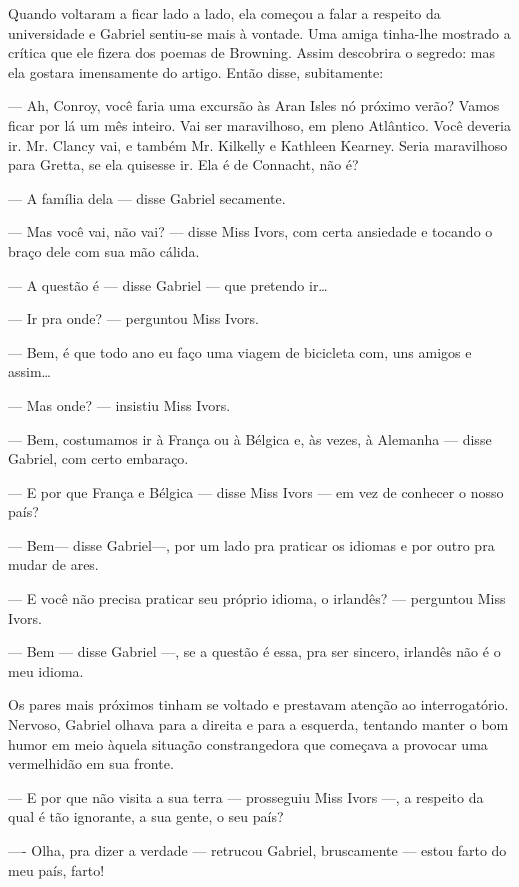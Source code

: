 Quando voltaram a ficar lado a lado, ela começou a falar a respeito
da universidade e Gabriel sentiu-se mais à vontade. Uma amiga
tinha-lhe mostrado a crítica que ele fizera dos poemas de Browning.
Assim descobrira o segredo: mas ela gostara imensamente do artigo.
Então disse, subitamente:

--- Ah, Conroy, você faria uma excursão às Aran Isles nó próximo
verão? Vamos ficar por lá um mês inteiro. Vai
ser maravilhoso, em pleno Atlântico. Você deveria ir. Mr. Clancy vai, e também
Mr. Kilkelly e Kathleen Kearney. Seria maravilhoso para Gretta, se ela
quisesse ir. Ela é de Connacht, não é?

--- A família dela --- disse Gabriel secamente.

--- Mas você vai, não vai? --- disse Miss Ivors, com certa ansiedade e
tocando o braço dele com sua mão cálida.

--- A questão é --- disse Gabriel --- que pretendo ir\ldots{}

--- Ir pra onde? --- perguntou Miss Ivors.

--- Bem, é que todo ano eu faço uma viagem de bicicleta com, uns
amigos e assim\ldots{}

--- Mas onde? --- insistiu Miss Ivors.

--- Bem, costumamos ir à França ou à Bélgica e, às vezes, à Alemanha
--- disse Gabriel, com certo embaraço.

--- E por que França e Bélgica --- disse Miss Ivors --- em vez de
conhecer o nosso país?

--- Bem--- disse Gabriel---, por um lado pra praticar os idiomas e por
outro pra mudar de ares.

--- E você não precisa praticar seu próprio idioma, o irlandês?  
--- perguntou Miss Ivors.

--- Bem --- disse Gabriel ---, se a questão é essa, pra ser sincero,
irlandês não é o meu idioma.

Os pares mais próximos tinham se voltado e prestavam atenção ao
interrogatório. Nervoso, Gabriel olhava para a direita e para a
esquerda, tentando manter o bom humor em meio àquela situação
constrangedora que começava a provocar uma vermelhidão em sua
fronte.

--- E por que não visita a sua terra --- prosseguiu Miss Ivors ---,
a respeito da qual é tão ignorante, a sua gente, o seu país?

---- Olha, pra dizer a verdade --- retrucou Gabriel, bruscamente 
--- estou farto do meu país, farto!

